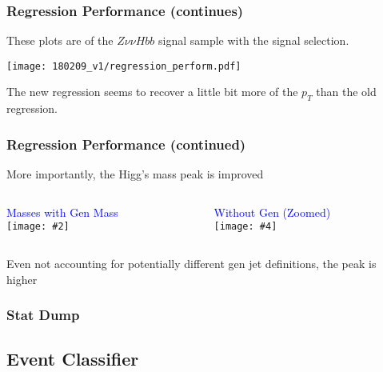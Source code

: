 \documentclass{beamer}
\newcommand{\twofigs}[4]{
  \begin{columns}
    \begin{column}{0.5\linewidth}
      \centering
      \textcolor{blue}{#1} \\
      \texttt{[image: \#2]}
    \end{column}
    \begin{column}{0.5\linewidth}
      \centering
      \textcolor{blue}{#3} \\
      \texttt{[image: \#4]}
    \end{column}
  \end{columns}
}
\begin{document}
\begin{frame}
  \frametitle{Regression Performance (continues)}

  These plots are of the $Z\nu\nu Hbb$ signal sample with the signal selection.

  \begin{center}
    \texttt{[image: 180209\_v1/regression\_perform.pdf]}
  \end{center}

  The new regression seems to recover a little bit more of the $p_T$ than the old regression.

\end{frame}

\begin{frame}
  \frametitle{Regression Performance (continued)}

  More importantly, the Higg's mass peak is improved

  \twofigs{Masses with Gen Mass}
          {180209_v1/regression_withgen.pdf}
          {Without Gen (Zoomed)}
          {180209_v1/regression.pdf}

  Even not accounting for potentially different gen jet definitions, the peak is higher

\end{frame}

\begin{frame}
  \frametitle{Stat Dump}
  

\end{frame}

\subsection{Event Classifier}
\end{document}
